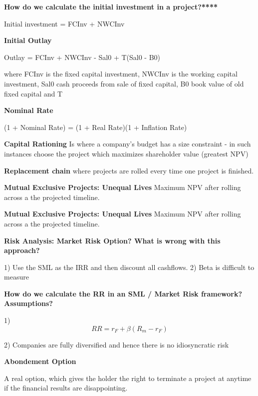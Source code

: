 \documentclass[12pt]{article}
\begin{document}
							 			\textbf{How do we calculate the initial investment in a project?****}
							 			
							 			Initial investment = FCInv + NWCInv
							 			
							 			\textbf{Initial Outlay}
							 			
							 			Outlay = FCInv + NWCInv - Sal0 + T(Sal0 - B0)
							 			
							 			where FCInv is the fixed capital investment, NWCInv is the working capital investment, Sal0 cash proceeds from sale of fixed capital, B0 book value of old fixed capital and T
							 			
							 			\textbf{Nominal Rate}
							 			
							 			(1 + Nominal Rate) = (1 + Real Rate)(1 + Inflation Rate)
							 			
							 			\textbf{Capital Rationing} Is where a company's budget has a size constraint - in such instances choose the project which maximizes shareholder value (greatest NPV)
							 			
							 			\textbf{Replacement chain} where projects are rolled every time one project is finished. 
							 										 			
							 			\textbf{Mutual Exclusive Projects: Unequal Lives} Maximum NPV after rolling across a the projected timeline.
							 			
							 				\textbf{Mutual Exclusive Projects: Unequal Lives} Maximum NPV after rolling across a the projected timeline.
							 				
							 			\textbf{Risk Analysis: Market Risk Option? What is wrong with this approach?}
							 			
							 			1) Use the SML as the IRR and then discount all cashflows. 
							 			2) Beta is difficult to measure
							 			
							 			\textbf{How do we calculate the RR in an SML / Market Risk  framework? Assumptions?}
							 			
							 			1) 
							 			$$
							 			RR = r_F + \beta (R_m - r_F)
							 			$$
							 			
							 			2) Companies are fully diversified and hence there is no idiosyncratic risk
							 			
							 			\textbf{Abondement Option}
							 			
							 			A real option, which gives the holder the right to terminate a project at anytime if the financial results are disappointing. 
							 			
\end{document}
